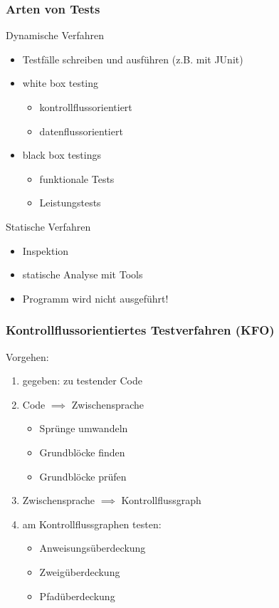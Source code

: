 \documentclass[18pt]{beamer}
\begin{document}
	\begin{frame}
		\frametitle{Arten von Tests}
		\begin{block}{Dynamische Verfahren}
			\begin{itemize}
				\item Testfälle schreiben und ausführen (z.B. mit JUnit) \pause
				\item white box testing \pause
				\begin{itemize}
					\item kontrollflussorientiert
					\item datenflussorientiert
				\end{itemize}
				\item black box testings \pause
				\begin{itemize}
					\item funktionale Tests \pause
					\item Leistungstests
				\end{itemize}
			\end{itemize}
		\end{block}
		\pause
		\begin{block}{Statische Verfahren}
			\begin{itemize}
				\item Inspektion \pause
				\item statische Analyse mit Tools \pause
				\item Programm wird nicht ausgeführt!
			\end{itemize}
		\end{block}
	\end{frame}

	\begin{frame}
		\frametitle{Kontrollflussorientiertes Testverfahren (KFO)}
		Vorgehen:
		\begin{enumerate}
			\item gegeben: zu testender Code \pause
			\item Code $\implies$ Zwischensprache
			\begin{itemize}
				\item Sprünge umwandeln
				\item Grundblöcke finden
				\item Grundblöcke prüfen
			\end{itemize}
			\pause
			\item Zwischensprache $\implies$ Kontrollflussgraph \pause
			\item am Kontrollflussgraphen testen: \pause
			\begin{itemize}
				\item Anweisungsüberdeckung
				\item Zweigüberdeckung 
				\item Pfadüberdeckung
			\end{itemize}
		\end{enumerate}
	\end{frame}
\end{document}
